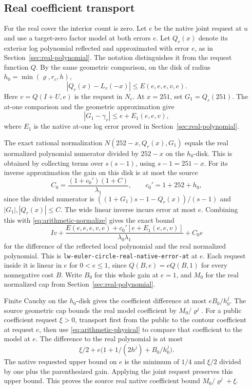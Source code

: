 \documentclass[11pt]{amsart}
\theoremstyle{definition}
\theoremstyle{remark}
\numberwithin{equation}{section}
\newcommand{\code}[1]{\nolinkurl{#1}}
\begin{document}
\subsection{Real coefficient transport}

For the real cover the interior count is zero. Let $e$
be the native joint request at $u$ and use a target-zero
factor model at both errors $e$. Let $Q_r(x)$ denote
its exterior log polynomial reflected and approximated
with error $e$, as in Section~\ref{sec:real-polynomial}.
The notation distinguishes it from the request function
$Q$. By the same geometric comparison, on the disk
of radius \(h_0=\min(\varrho,r_c,h)\),
\[
              |Q_r(x)-L_v(-x)|\le E(e,e,e,v,e).
\]
Here \(v=Q(I+U,e)\) is the request in \(N_e\).
At \(x=251\), set \(G_1=Q_r(251)\). The at-one
comparison and the geometric approximation give
\[
                |G_1-\gamma_v|\le e+E_1(e,e,v),
\]
where \(E_1\) is the native at-one log error proved
in Section~\ref{sec:real-polynomial}.

The exact rational normalization
\(N(252-x,Q_r(x),G_1)\) equals the real normalized
polynomial numerator divided by \(252-x\) on
the \(h_0\)-disk. This is obtained by collecting
terms over \(s(s-1)\), using \(s-1=251-x\).
For its inverse approximation the gain on this
disk is at most the source
\[
        C_0=\frac{(1+c_0')(1+C)}{\lambda_1},
             \qquad c_0'=1+252+h_0 ,
\]
since the divided numerator is
\(((1+G_1)s-1-Q_r(x))/(s-1)\) and
\(|G_1|,|Q_r(x)|\le C\).
The wide linear inverse incurs error at most $e$.
Combining this with \eqref{eq:arithmetic-normalize}
gives the exact bound
\[
 I v+
 \frac{E(e,e,e,v,e)+c_0'[e+E_1(e,e,v)]}{\lambda_0\lambda_1}
 +C_0 e
\]
for the difference of the reflected local polynomial
and the real normalized polynomial. This is
\code{lw-euler-circle-real-native-error-at} at $e$.
Each request inside it is linear in \(e\) for
\(0<e\le1\), since \(Q(B,e)=eQ(B,1)\) for every
nonnegative cost \(B\). Write \(B_0\) for this
whole gain at \(e=1\), and \(M_0\) for the real
normalized cap from Section~\ref{sec:real-polynomial}.

Finite Cauchy on the \(h_0\)-disk gives the coefficient
difference at most \(eB_0/h_0^j\).
The source geometric cap bounds the real model
coefficient by \(M_0/\varrho^j\). For a public
coefficient request \(\xi>0\), transport first
from the public to the contour coefficient at
request \(e\), then use \eqref{eq:arithmetic-physical}
to compare that coefficient to the model at \(e\).
The difference to the real polynomial is at most
\[
       \xi/2+e\bigl(1+1/(2h^j)+B_0/h_0^j\bigr).
\]
The native requested upper bound on \(e\) is the
minimum of \(1/4\) and \(\xi/2\) divided by one
plus the parenthesized gain. Applying the joint
request preserves this upper bound. This proves
the source real native coefficient bound
\(M_0/\varrho^j+\xi\).
\end{document}
